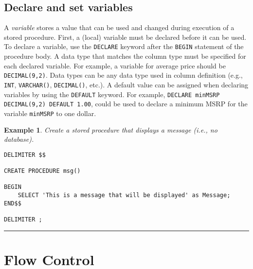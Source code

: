 \documentclass{article}
\newtheorem{example}{Example}
\begin{document}
\subsection*{Declare and set variables}

A \textit{variable} stores a value that can be used and changed during execution of a stored procedure.  First, a (local) variable must be declared before it can be used.  To declare a variable, use the \texttt{DECLARE} keyword after the \texttt{BEGIN} statement of the procedure body.  A data type that matches the column type must be specified for each declared variable.  For example, a variable for average price should be \texttt{DECIMAL(9,2)}.  Data types can be any data type used in column definition (e.g., \texttt{INT},  \texttt{VARCHAR()},  \texttt{DECIMAL()},  etc.).  A default value can be assigned when declaring variables by using the \texttt{DEFAULT} keyword.  For example, \texttt{DECLARE minMSRP DECIMAL(9,2) DEFAULT 1.00}, could be used to declare a minimum MSRP for the variable \texttt{minMSRP} to one dollar.



\begin{example}
Create a stored procedure that displays a message (i.e., no database).
\end{example}
 
 \begin{lstlisting}[frame=single]  
DELIMITER $$

CREATE PROCEDURE msg()

BEGIN
	SELECT 'This is a message that will be displayed' as Message;
END$$

DELIMITER ;
\end{lstlisting} 





   
  
  
  
  
  
  
  
  
\hspace{-0.5cm}\rule[-0.101in]{\textwidth}{0.0025in}
  
  
\section*{Flow Control}
\end{document}
